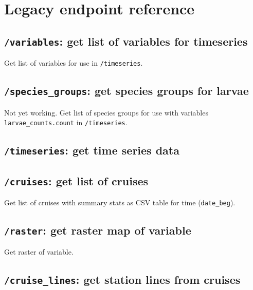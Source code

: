 \documentclass[
  letterpaper,
  DIV=11,
  numbers=noendperiod]{scrreprt}
\begin{document}
\section{Legacy endpoint reference}\label{legacy-endpoint-reference}

\subsection{\texorpdfstring{\texttt{/variables}: get list of variables
for
timeseries}{/variables: get list of variables for timeseries}}\label{variables-get-list-of-variables-for-timeseries}

Get list of variables for use in \texttt{/timeseries}.

\subsection{\texorpdfstring{\texttt{/species\_groups}: get species
groups for
larvae}{/species\_groups: get species groups for larvae}}\label{species_groups-get-species-groups-for-larvae}

Not yet working. Get list of species groups for use with variables
\texttt{larvae\_counts.count} in \texttt{/timeseries}.

\subsection{\texorpdfstring{\texttt{/timeseries}: get time series
data}{/timeseries: get time series data}}\label{timeseries-get-time-series-data}

\subsection{\texorpdfstring{\texttt{/cruises}: get list of
cruises}{/cruises: get list of cruises}}\label{cruises-get-list-of-cruises}

Get list of cruises with summary stats as CSV table for time
(\texttt{date\_beg}).

\subsection{\texorpdfstring{\texttt{/raster}: get raster map of
variable}{/raster: get raster map of variable}}\label{raster-get-raster-map-of-variable}

Get raster of variable.

\subsection{\texorpdfstring{\texttt{/cruise\_lines}: get station lines
from
cruises}{/cruise\_lines: get station lines from cruises}}\label{cruise_lines-get-station-lines-from-cruises}
\end{document}
